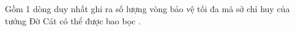 Gồm 1 dòng duy nhất ghi ra số lượng vòng bảo vệ tối đa mà sở chỉ huy của tướng Đờ Cát có thể được bao bọc .